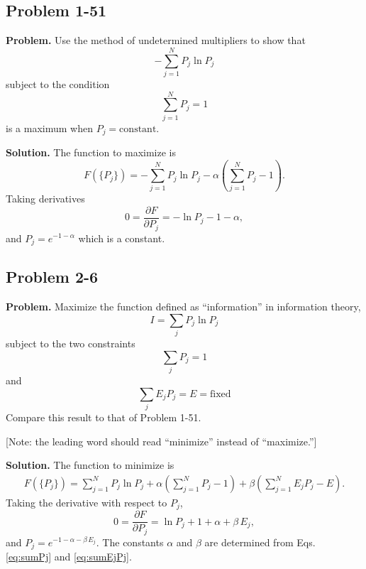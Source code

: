 \documentclass[twocolumn, 10pt]{article}
\numberwithin{equation}{section}
\newenvironment{problem}
{\par\medskip\sffamily \color{problue}
  \textbf{Problem. }\ignorespaces}
{\medskip}
\newenvironment{solution}
{\par\medskip
  \textbf{Solution. }\ignorespaces}
{\medskip}
\begin{document}
\subsection{Problem 1-51}

\begin{problem}
  Use the method of undetermined multipliers to show that
  $$
  -\sum_{j=1}^N P_j \ln P_j
  $$
  subject to the condition
  $$
  \sum_{j=1}^N P_j = 1
  $$
  is a maximum when $P_j = \mathrm{constant}$.
\end{problem}

\begin{solution}
The function to maximize is
$$
F(\{P_j\}) = -\sum_{j=1}^N P_j \ln P_j - \alpha \left( \sum_{j=1}^N P_j - 1 \right).
$$
Taking derivatives
$$
  0 = \frac{ \partial F } { \partial P_j }
  =
  -\ln P_j - 1 - \alpha,
$$
and $P_j = e^{-1-\alpha}$ which is a constant.
\end{solution}

\subsection{Problem 2-6}

\begin{problem}
Maximize the function defined as ``information'' in information theory,
$$
I = \sum_j P_j \ln P_j
$$
subject to the two constraints
\begin{equation}
  \sum_j P_j = 1
  \label{eq:sumPj}
\end{equation}
and
\begin{equation}
  \sum_j E_j P_j = E = \mathrm{fixed}
  \label{eq:sumEjPj}
\end{equation}
Compare this result to that of Problem 1-51.

[Note: the leading word should read ``minimize''
  instead of ``maximize.'']
\end{problem}

\begin{solution}
The function to minimize is
%
\begin{align*}
F(\{P_j\})
  = \sum_{j=1}^N P_j \ln P_j
  + \alpha ( \sum_{j=1}^N P_j - 1 )
  + \beta  ( \sum_{j=1}^N E_j P_j - E ).
\end{align*}
%
Taking the derivative with respect to $P_j$,
$$
  0 = \frac{ \partial F } { \partial P_j }
  =
  \ln P_j + 1 + \alpha + \beta \, E_j,
$$
and $P_j = e^{-1-\alpha-\beta \, E_j}$.
%
The constants $\alpha$ and $\beta$
are determined from Eqs. \eqref{eq:sumPj} and \eqref{eq:sumEjPj}.
\end{solution}
\end{document}
